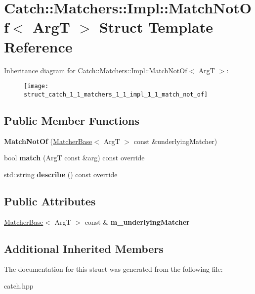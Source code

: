 \hypertarget{struct_catch_1_1_matchers_1_1_impl_1_1_match_not_of}{}\section{Catch\+:\+:Matchers\+:\+:Impl\+:\+:Match\+Not\+Of$<$ ArgT $>$ Struct Template Reference}
\label{struct_catch_1_1_matchers_1_1_impl_1_1_match_not_of}
Inheritance diagram for Catch\+:\+:Matchers\+:\+:Impl\+:\+:Match\+Not\+Of$<$ ArgT $>$\+:\begin{figure}[H]
\begin{center}
\leavevmode
\texttt{[image: struct\_catch\_1\_1\_matchers\_1\_1\_impl\_1\_1\_match\_not\_of]}
\end{center}
\end{figure}
\subsection*{Public Member Functions}
\begin{DoxyCompactItemize}
\item 
\mbox{\label{struct_catch_1_1_matchers_1_1_impl_1_1_match_not_of_a47afdd9e4c3354cef85adc3186097ae4}} 
{\bfseries Match\+Not\+Of} (\mbox{\hyperlink{struct_catch_1_1_matchers_1_1_impl_1_1_matcher_base}{Matcher\+Base}}$<$ ArgT $>$ const \&underlying\+Matcher)
\item 
\mbox{\label{struct_catch_1_1_matchers_1_1_impl_1_1_match_not_of_a181d693c0258e582d80dc6117a1f2b66}} 
bool {\bfseries match} (ArgT const \&arg) const override
\item 
\mbox{\label{struct_catch_1_1_matchers_1_1_impl_1_1_match_not_of_ac5fb4ef6a9069d23a4098c3c818f06b0}} 
std\+::string {\bfseries describe} () const override
\end{DoxyCompactItemize}
\subsection*{Public Attributes}
\begin{DoxyCompactItemize}
\item 
\mbox{\label{struct_catch_1_1_matchers_1_1_impl_1_1_match_not_of_af7ac67f112b0e93796b048a47329aad4}} 
\mbox{\hyperlink{struct_catch_1_1_matchers_1_1_impl_1_1_matcher_base}{Matcher\+Base}}$<$ ArgT $>$ const  \& {\bfseries m\+\_\+underlying\+Matcher}
\end{DoxyCompactItemize}
\subsection*{Additional Inherited Members}


The documentation for this struct was generated from the following file\+:\begin{DoxyCompactItemize}
\item 
catch.\+hpp\end{DoxyCompactItemize}
